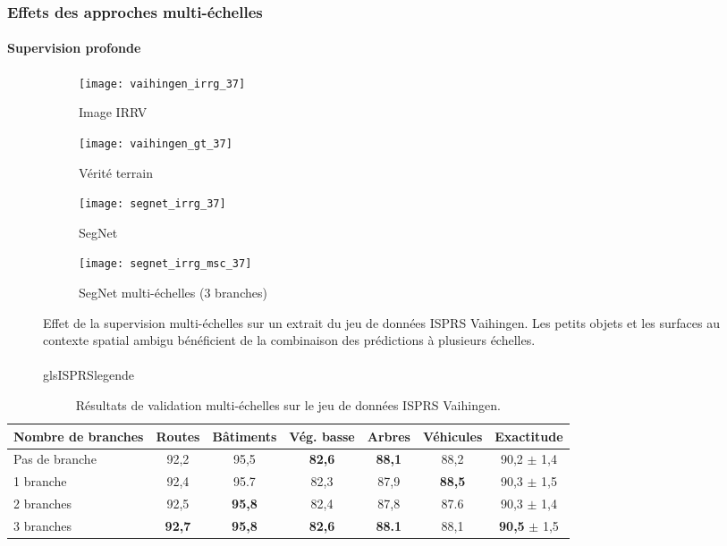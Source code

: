 \subsubsection{Effets des approches multi-échelles}

\paragraph{Supervision profonde}

\begin{figure}[!htb]
	\hfill
	\begin{subfigure}{0.45\textwidth}
    \texttt{[image: vaihingen\_irrg\_37]}
    \caption{Image \gls{IRRV}}
    \end{subfigure}
    \hfill
    \begin{subfigure}{0.45\textwidth}
    \texttt{[image: vaihingen\_gt\_37]}
    \caption{Vérité terrain}
    \end{subfigure}
    \hfill

    \hfill
    \begin{subfigure}{0.45\textwidth}
    \texttt{[image: segnet\_irrg\_37]}
    \caption{SegNet}
    \end{subfigure}
    \hfill
    \begin{subfigure}{0.45\textwidth}
    \texttt{[image: segnet\_irrg\_msc\_37]}
    \caption{SegNet multi-échelles (3 branches)}
    \end{subfigure}
    \hfill
    \caption{Effet de la supervision multi-échelles sur un extrait du jeu de données \gls{ISPRS} Vaihingen. Les petits objets et les surfaces au contexte spatial ambigu bénéficient de la combinaison des prédictions à plusieurs échelles.\\
		\\gls{ISPRS}legende}
    \label{fig:vaihingen_images}
\end{figure}

\begin{table}
    \caption{Résultats de validation multi-échelles sur le jeu de données \gls{ISPRS} Vaihingen.}
    \label{tab:dsn_vaihingen}
	\begin{tabularx}{\textwidth}{Y c c c c c c}
    \toprule
    Nombre de branches & Routes & Bâtiments & Vég. basse & Arbres & Véhicules & Exactitude\\
    \midrule
    Pas de branche & 92,2 & 95,5 & \textbf{82,6} & \textbf{88,1} & 88,2 & 90,2 {\small $\pm$ 1,4}\\
    1 branche & 92,4 & 95.7 & 82,3 & 87,9 & \textbf{88,5} & 90,3 {\small $\pm$ 1,5}\\
    2 branches & 92,5 & \textbf{95,8} & 82,4 & 87,8 & 87.6 & 90,3 {\small $\pm$ 1,4}\\
    3 branches & \textbf{92,7} & \textbf{95,8} & \textbf{82,6} & \textbf{88.1} & 88,1 & \textbf{90,5} {\small $\pm$ 1,5}\\
    \bottomrule
    \end{tabularx}
\end{table}

